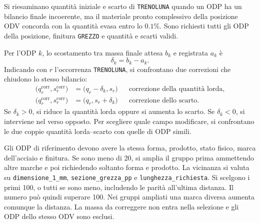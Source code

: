 Si riesaminano quantità iniziale e scarto di \texttt{TRENOLUNA} quando un ODP ha un bilancio finale incoerente, ma il materiale pronto complessivo della posizione ODV concorda con la quantità evasa entro lo $0.1\%$. Sono richiesti tutti gli ODP della posizione, finitura \texttt{GREZZO} e quantità e scarti validi.

Per l'ODP $k$, lo scostamento tra massa finale attesa $b_k$ e registrata $a_k$ è
\begin{equation}
\label{eq:root-mass-discrepancy}
\delta_k=b_k-a_k.
\end{equation}
Indicando con $r$ l'occorrenza \texttt{TRENOLUNA}, si confrontano due correzioni che chiudono lo stesso bilancio:
\begin{equation}
\label{eq:root-mass-alternatives}
\begin{aligned}
\bigl(q_r^{\mathrm{corr}},s_r^{\mathrm{corr}}\bigr)
  &=\bigl(q_r-\delta_k,s_r\bigr)
  &&\text{correzione della quantità lorda},\\
\bigl(q_r^{\mathrm{corr}},s_r^{\mathrm{corr}}\bigr)
  &=\bigl(q_r,s_r+\delta_k\bigr)
  &&\text{correzione dello scarto}.
\end{aligned}
\end{equation}
Se $\delta_k>0$, si riduce la quantità lorda oppure si aumenta lo scarto. Se $\delta_k<0$, si interviene nel verso opposto. Per scegliere quale campo modificare, si confrontano le due coppie quantità lorda--scarto con quelle di ODP simili.

Gli ODP di riferimento devono avere la stessa forma, prodotto, stato fisico, marca dell'acciaio e finitura. Se sono meno di 20, si amplia il gruppo prima ammettendo altre marche e poi richiedendo soltanto forma e prodotto. La vicinanza si valuta su \texttt{dimensione\_1\_mm}, \texttt{sezione\_grezza\_pp} e \texttt{lunghezza\_richiesta}. Si scelgono i primi 100, o tutti se sono meno, includendo le parità all'ultima distanza. Il numero può quindi superare 100. Nei gruppi ampliati una marca diversa aumenta comunque la distanza. La massa da correggere non entra nella selezione e gli ODP dello stesso ODV sono esclusi.


